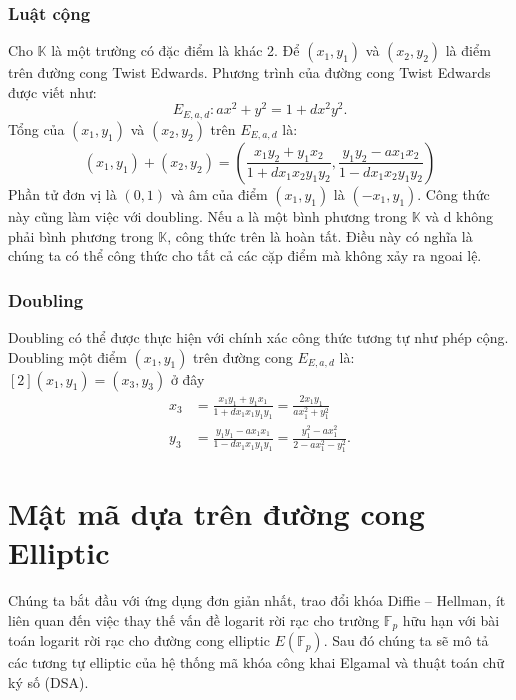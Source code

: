 \documentclass[a4paper,12pt]{report}
\begin{document}
\subsubsection{Luật cộng}
Cho $\displaystyle \mathbb{K}$ là một trường có đặc điểm là khác 2. Để $\displaystyle (x_{1}, y_{1})$ và $\displaystyle (x_{2}, y_{2})$ là điểm trên đường cong Twist Edwards. Phương trình của đường cong Twist Edwards được viết như:
\begin{displaymath}
E_{E,a,d}: ax^2 + y^2 = 1 + dx^2y^2.
\end{displaymath}
Tổng của $(x_1, y_1)$ và $(x_2, y_2)$ trên $E_{E,a,d}$ là:
\begin{displaymath}
(x_{1}, y_{1}) + (x_{2}, y_{2}) = \left({\frac {x_{1}y_{2} + y_{1}x_{2}} { 1 + dx_{1}x_{2}y_{1}y_{2}}}, {\frac{y_{1}y_{2} - ax_{1}x_{2}} {1 - dx_{1}x_{2}y_{1}y_{2}}} \right)
\end{displaymath}
Phần tử đơn vị là $(0,1)$ và âm của điểm $(x_1, y_1)$ là $(-x_1, y_1)$. Công thức này cũng làm việc với doubling. Nếu a là một bình phương trong $\mathbb{K}$ và d không phải bình phương trong $\mathbb{K}$, công thức trên là hoàn tất. Điều này có nghĩa là chúng ta có thể công thức cho tất cả các cặp điểm mà không xảy ra ngoai lệ.
\subsubsection{Doubling}
Doubling có thể được thực hiện với chính xác công thức tương tự như phép cộng. Doubling một điểm $(x_1 , y_1)$ trên đường cong $E_{E,a,d}$ là: $[2](x_1, y_1) = (x_3, y_3)$ ở đây
\begin{displaymath}
\begin{aligned}
x_{3} &= {\frac{x_{1}y_{1}+y_{1}x_{1}}{1+dx_{1}x_{1}y_{1}y_{1}}}={\frac {2x_{1}y_{1}}{ax_{1}^{2}+y_{1}^{2}}} \\[6pt]
y_{3} &= {\frac {y_{1}y_{1} - ax_{1}x_{1}}{1 - dx_{1}x_{1}y_{1}y_{1}}}={\frac{y_{1}^{2} - ax_{1}^{2}}{2 - ax_{1}^{2} - y_{1}^{2}}}.
\end{aligned}
\end{displaymath}
\section{Mật mã dựa trên đường cong Elliptic}
Chúng ta bắt đầu với ứng dụng đơn giản nhất, trao đổi khóa Diffie – Hellman, ít liên quan đến việc thay thế vấn đề logarit rời rạc cho trường $\mathbb{F}_p$ hữu hạn với bài toán logarit rời rạc cho đường cong elliptic $E(\mathbb{F}_p)$. Sau đó chúng ta sẽ mô tả các tương tự elliptic của hệ thống mã khóa công khai Elgamal và thuật toán chữ ký số (DSA).
\end{document}
